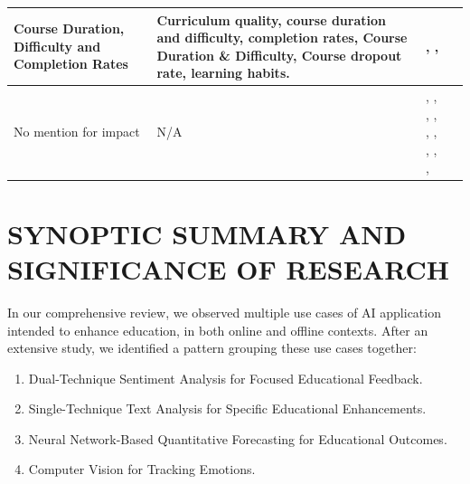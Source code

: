 \documentclass{svproc}
\begin{document}
\begin{table}
\begin{tabularx}{\textwidth}{|X|X|X|X|}
        \hline
        Course Duration, Difficulty and Completion Rates & Curriculum quality, course duration and difficulty, completion rates, Course Duration \& Difficulty, Course dropout rate, learning habits. & \cite{Competition_Neural_Network_Model_Application_in_the_Bilingual_Teaching_Quality_Evaluation_of_Universities}, \cite{Experience_in_learners_review_to_determine_attribute_relation_for_course_completion}, \cite{Exploring_Causes_for_the_Dropout_on_Massive_Open_Online_Courses} \\
        \hline
        No mention for impact  & N/A & \cite{Research_on_the_Application_of_BP_Neural_Network_in_Vocal_Music_Teaching_Quality_Evaluation}, \cite{Design_of_online_teaching_quality_evaluation_system_for_Private_University_Research_based_on_deep_learning_algorithm}, \cite{Sentiment_analysis_of_student_feedback_using_machine_learning_and_lexicon-based_approaches}, \cite{BP_Neural_Network-Based_Evaluation_on_University_Teachers'_Teaching_Quality}, \cite{Automatic_Rules_Generation_for_Teaching_Strategies_Improvement}, \cite{Evaluation_Model_of_PE_Teaching_Quality_Based_on_Active_Learning_Support_Vector_Machine}, \cite{Evaluation_System_of_Tourism_Psychology_Teaching_Quality_Based_on_Convolutional_Neural_Network}, \cite{An_Evaluation_Model_of_Moral_Education_Teaching_Quality_in_Universities_Based_on_System_Control_Theory}, \cite{Personalized_Learning_Model_based_on_Deep_Learning_Algorithm_for_Student_Behaviour_Analytic}, \cite{The_Evaluation_and_Application_of_BP_Neural_Network_in_the_Multiple_Quality_Assurance_Paths_of_Higher_Education} \\
        \hline
    \end{tabularx}
\end{table}

\section{SYNOPTIC SUMMARY AND SIGNIFICANCE OF RESEARCH}
\label{SYNOPTIC SUMMARY AND SIGNIFICANCE OF RESEARCH}
In our comprehensive review, we observed multiple use cases of AI application intended to enhance education, in both online and offline contexts. After an extensive study, we identified a pattern grouping these use cases together:

\begin{enumerate}
  \item Dual-Technique Sentiment Analysis for Focused Educational Feedback.
  \item Single-Technique Text Analysis for Specific Educational Enhancements.
  \item Neural Network-Based Quantitative Forecasting for Educational Outcomes.
  \item Computer Vision for Tracking Emotions.
\end{enumerate}
\end{document}
